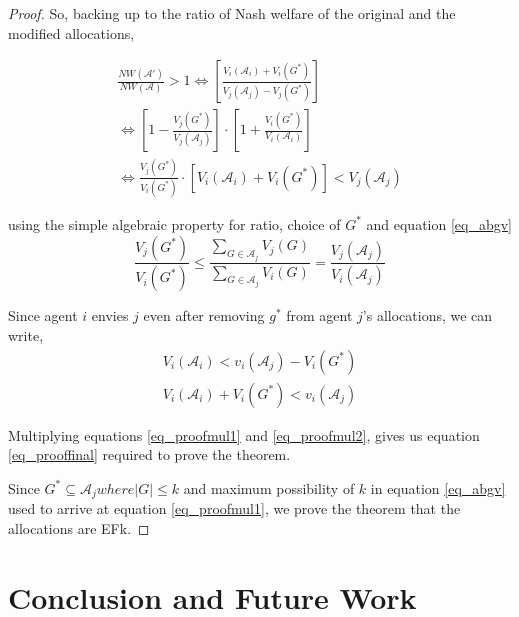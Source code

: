 \begin{proof}
So, backing up to the ratio of Nash welfare of the original and the modified allocations,

\begin{equation}
\label{eq_prooffinal}
\begin{gathered}
    \frac{NW(\mathcal{A}')}{NW(\mathcal{A})} > 1 \Leftrightarrow \left[\frac{V_i(\mathcal{A}_i) + V_i(G^*)}{V_j(\mathcal{A}_j) - V_j(G^*)}\right] \\
    \Leftrightarrow \left[1 - \frac{V_j(G^*)}{V_j(\mathcal{A}_j)}\right] \cdot \left[1 + \frac{V_i(G^*)}{V_i(\mathcal{A}_i)}\right] \\
    \Leftrightarrow \frac{V_j(G^*)}{V_i(G^*)} \cdot \left[V_i(\mathcal{A}_i) + V_i(G^*) \right] < V_j(\mathcal{A}_j)
\end{gathered}
\end{equation}

using the simple algebraic property for ratio, choice of $G^*$ and equation \ref{eq_abgv}
\begin{equation}
\label{eq_proofmul1}
    \frac{V_j(G^*)}{V_i(G^*)} \leq \frac{\sum_{G \in \mathcal{A}_j}V_j(G)}{\sum_{G \in \mathcal{A}_j}V_i(G)} = \frac{V_j(\mathcal{A}_j)}{V_i(\mathcal{A}_j)}
\end{equation}

Since agent $i$ envies $j$ even after removing $g^*$ from agent $j$'s allocations, we can write,
\begin{equation}
\label{eq_proofmul2}
\begin{gathered}
    V_i(\mathcal{A}_i) < v_i(\mathcal{A}_j) - V_i(G^*) \\
    V_i(\mathcal{A}_i) + V_i(G^*) < v_i(\mathcal{A}_j)
\end{gathered}
\end{equation}

Multiplying equations \ref{eq_proofmul1} and \ref{eq_proofmul2}, gives us equation \ref{eq_prooffinal} required to prove the theorem.

Since $G^* \subseteq \mathcal{A}_j where |G| \leq k$ and maximum possibility of $k$ in equation \ref{eq_abgv} used to arrive at equation \ref{eq_proofmul1}, we prove the theorem that the allocations are EFk.

\end{proof}

\section{Conclusion and Future Work}

